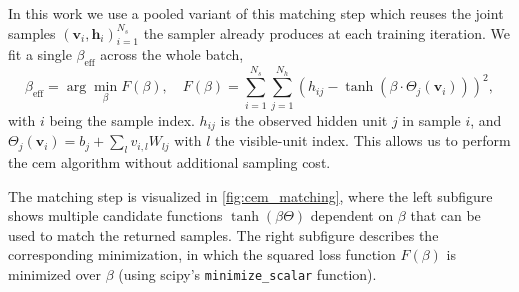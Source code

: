 \documentclass[10pt,a4paper]{article}
\numberwithin{equation}{section}
\begin{document}
In this work we use a pooled variant of this matching step which reuses the joint samples $(\mathbf{v}_i,\mathbf{h}_i)_{i=1}^{N_s}$ the sampler already produces at each training iteration. We fit a single $\beta_\text{eff}$ across the whole batch,
\begin{equation}
\beta_\text{eff} = \arg\min_\beta F(\beta), \quad F(\beta) = \sum_{i=1}^{N_s}\sum_{j=1}^{N_h}\left(h_{ij}-\tanh(\beta\cdot\Theta_j(\mathbf{v}_i))\right)^2,
\end{equation}
with $i$ being the sample index. $h_{ij}$ is the observed hidden unit $j$ in sample $i$, and $\Theta_j(\mathbf{v}_i) = b_j + \sum_l v_{i,l}W_{lj}$ with $l$ the visible-unit index. This allows us to perform the \gls{cem} algorithm without additional sampling cost.

The matching step is visualized in \autoref{fig:cem_matching}, where the left subfigure shows multiple candidate functions $\tanh(\beta\Theta)$ dependent on $\beta$ that can be used to match the returned samples. The right subfigure describes the corresponding minimization, in which the squared loss function $F(\beta)$ is minimized over $\beta$ (using scipy's \texttt{minimize\_scalar} function).
\end{document}
